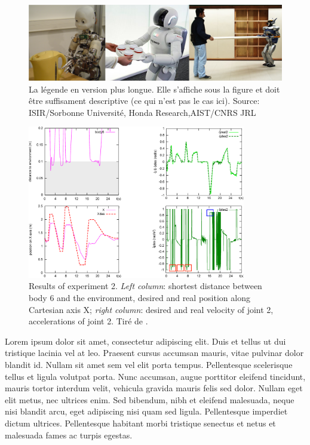 \documentclass[a4paper,11pt]{scrbook}
\begin{document}
\begin{figure}
\centering
\includegraphics[width=\textwidth]{several_humanoids.png}
\caption[Un texte résumant la légende]{La légende en version plus longue. Elle s'affiche sous la figure et doit être suffisament descriptive (ce qui n'est pas le cas ici). Source: ISIR/Sorbonne Université, Honda Research,AIST/CNRS JRL \label{fig:intro_figure}}
\end{figure}

\begin{figure}
	 \centering
	 \includegraphics[width=0.85\textwidth]{figure11.pdf}
	 \caption{Results of experiment 2. \textit{Left column}: shortest distance between body 6 and the environment, desired and real position along Cartesian axis X; \textit{right column}: desired and real velocity of joint 2, accelerations of joint 2. Tiré de \cite{rubrecht-AutonomousRobots2012}.}
	 \label{fig:resimpact}
\end{figure}

Lorem ipsum dolor sit amet, consectetur adipiscing elit. Duis et tellus ut dui tristique lacinia vel at leo. Praesent cursus accumsan mauris, vitae pulvinar dolor blandit id. Nullam sit amet sem vel elit porta tempus. Pellentesque scelerisque tellus et ligula volutpat porta. Nunc accumsan, augue porttitor eleifend tincidunt, mauris tortor interdum velit, vehicula gravida mauris felis sed dolor. Nullam eget elit metus, nec ultrices enim. Sed bibendum, nibh et eleifend malesuada, neque nisi blandit arcu, eget adipiscing nisi quam sed ligula. Pellentesque imperdiet dictum ultrices. Pellentesque habitant morbi tristique senectus et netus et malesuada fames ac turpis egestas.
\end{document}
